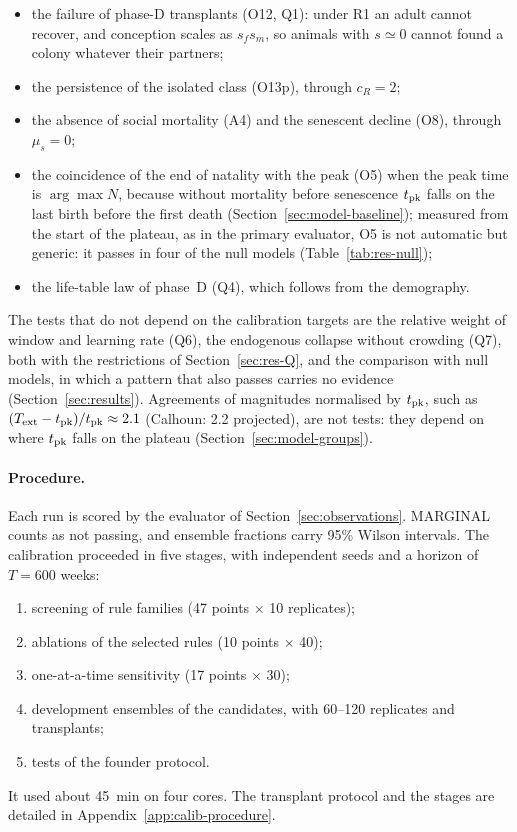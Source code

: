 \begin{itemize}
  \item the failure of phase-D transplants (O12, Q1): under R1 an adult cannot recover, and conception scales as
    $s_fs_m$, so animals with $s\simeq0$ cannot found a colony whatever their partners;
  \item the persistence of the isolated class (O13p), through $c_R=2$;
  \item the absence of social mortality (A4) and the senescent decline (O8), through $\mu_s=0$;
  \item the coincidence of the end of natality with the peak (O5) when the peak time is $\arg\max N$, because without
    mortality before senescence $t_{\rm pk}$ falls on the last birth before the first death
    (Section~\ref{sec:model-baseline}); measured from the start of the plateau, as in the primary evaluator, O5 is not
    automatic but generic: it passes in four of the null models (Table~\ref{tab:res-null});
  \item the life-table law of phase~D (Q4), which follows from the demography.
\end{itemize}
The tests that do not depend on the calibration targets are the relative weight of window and learning rate (Q6),
the endogenous collapse without crowding (Q7), both with the restrictions of Section~\ref{sec:res-Q}, and the
comparison with null models, in which a pattern that also passes carries no evidence (Section~\ref{sec:results}).
Agreements of magnitudes normalised by $t_{\rm pk}$, such as $(T_{\rm ext}-t_{\rm pk})/t_{\rm pk}\approx2.1$
(Calhoun: 2.2 projected), are not tests: they depend on where $t_{\rm pk}$ falls on the plateau
(Section~\ref{sec:model-groups}).

\paragraph{Procedure.}
\label{sec:calib-procedure}
Each run is scored by the evaluator of Section~\ref{sec:observations}. MARGINAL counts as not passing, and
ensemble fractions carry 95\% Wilson intervals. The calibration proceeded in five stages, with independent
seeds and a horizon of $T=600$ weeks:
\begin{enumerate}
  \item screening of rule families (47 points $\times$ 10 replicates);
  \item ablations of the selected rules (10 points $\times$ 40);
  \item one-at-a-time sensitivity (17 points $\times$ 30);
  \item development ensembles of the candidates, with 60--120 replicates and transplants;
  \item tests of the founder protocol.
\end{enumerate}
It used about 45~min on four cores. The transplant protocol and the stages are detailed in
Appendix~\ref{app:calib-procedure}.

